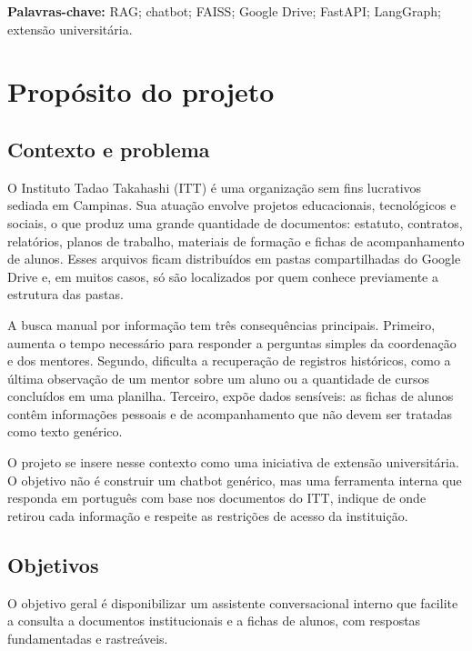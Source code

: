 \documentclass[12pt,a4paper]{article}
\begin{document}
\noindent\textbf{Palavras-chave:} RAG; chatbot; FAISS; Google Drive; FastAPI;
LangGraph; extensão universitária.

\newpage
\begingroup
\small
\tableofcontents
\endgroup
\newpage
\listoffigures
\listoftables
\newpage

\section{Propósito do projeto}

\subsection{Contexto e problema}

O Instituto Tadao Takahashi (ITT) é uma organização sem fins lucrativos
sediada em Campinas. Sua atuação envolve projetos educacionais, tecnológicos e
sociais, o que produz uma grande quantidade de documentos: estatuto, contratos,
relatórios, planos de trabalho, materiais de formação e fichas de acompanhamento
de alunos. Esses arquivos ficam distribuídos em pastas compartilhadas do Google
Drive e, em muitos casos, só são localizados por quem conhece previamente a
estrutura das pastas.

A busca manual por informação tem três consequências principais. Primeiro, aumenta
o tempo necessário para responder a perguntas simples da coordenação e dos
mentores. Segundo, dificulta a recuperação de registros históricos, como a última
observação de um mentor sobre um aluno ou a quantidade de cursos concluídos em uma
planilha. Terceiro, expõe dados sensíveis: as fichas de alunos contêm informações
pessoais e de acompanhamento que não devem ser tratadas como texto genérico.

O projeto se insere nesse contexto como uma iniciativa de extensão universitária.
O objetivo não é construir um chatbot genérico, mas uma ferramenta interna que
responda em português com base nos documentos do ITT, indique de onde retirou cada
informação e respeite as restrições de acesso da instituição.

\subsection{Objetivos}

O objetivo geral é disponibilizar um assistente conversacional interno que facilite
a consulta a documentos institucionais e a fichas de alunos, com respostas
fundamentadas e rastreáveis.
\end{document}
